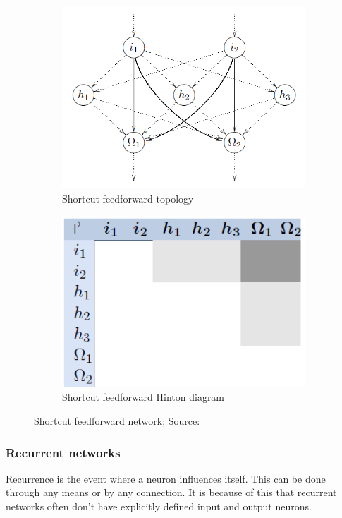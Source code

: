 \documentclass[pdftex,a4paper,12pt,twoside]{report}
\theoremstyle{plain} \newtheorem{theorem}{Theorem} \newtheorem{proposition}{Proposition} \newtheorem{lemma}{Lemma} \newtheorem*{corollary}{Corollary}
\theoremstyle{definition} \newtheorem{definition}{Definition} \newtheorem{conjecture}{Conjecture} \newtheorem*{example}{Example} \newtheorem{algorithm}{Algorithm}
\theoremstyle{remark} \newtheorem*{remark}{Remark} \newtheorem*{note}{Note} \newtheorem{case}{Case}
\begin{document}
\begin{figure}
\centering
	\begin{subfigure}[b]{0.3\textwidth}
	\centering
	\includegraphics[width=\textwidth]{./img/Feedforward-shortcut-Topology.png}
	\caption{Shortcut feedforward topology}
	\end{subfigure}
	\begin{subfigure}[b]{0.3\textwidth}
	\centering
	\includegraphics[width=\textwidth]{./img/Feedforward-shortcut-Hinton.png}
	\caption{Shortcut feedforward Hinton diagram}
	\end{subfigure}
\caption{Shortcut feedforward network; Source:\citep{Kriesel2013}}
\label{fig:shortcutfeedforward}
\end{figure}
\subsubsection{Recurrent networks}
Recurrence is the event where a neuron influences itself. This can be done through any means or by any connection. It is because of this that recurrent networks often don't have explicitly defined input and output neurons.
\end{document}
